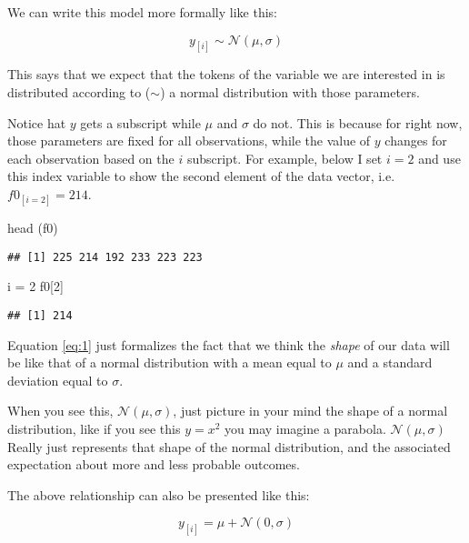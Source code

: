 \documentclass[
]{book}
\newenvironment{Shaded}{\begin{snugshade}}{\end{snugshade}}
\newcommand{\DecValTok}[1]{\textcolor[rgb]{0.00,0.00,0.81}{#1}}
\newcommand{\FunctionTok}[1]{\textcolor[rgb]{0.00,0.00,0.00}{#1}}
\newcommand{\NormalTok}[1]{#1}
\newcommand{\OtherTok}[1]{\textcolor[rgb]{0.56,0.35,0.01}{#1}}
\begin{document}
We can write this model more formally like this:

\[
y_{[i]} \sim \mathcal{N}(\mu,\sigma)
\label{eq:1}
\]

This says that we expect that the tokens of the variable we are interested in is distributed according to (\(\sim\)) a normal distribution with those parameters.

Notice hat \(y\) gets a subscript while \(\mu\) and \(\sigma\) do not. This is because for right now, those parameters are fixed for all observations, while the value of \(y\) changes for each observation based on the \(i\) subscript. For example, below I set \(i=2\) and use this index variable to show the second element of the data vector, i.e.~\(f0_{[i=2]}=214\).

\begin{Shaded}
\begin{Highlighting}[]
\FunctionTok{head}\NormalTok{ (f0)}
\end{Highlighting}
\end{Shaded}

\begin{verbatim}
## [1] 225 214 192 233 223 223
\end{verbatim}

\begin{Shaded}
\begin{Highlighting}[]
\NormalTok{i }\OtherTok{=} \DecValTok{2}
\NormalTok{f0[}\DecValTok{2}\NormalTok{]}
\end{Highlighting}
\end{Shaded}

\begin{verbatim}
## [1] 214
\end{verbatim}

Equation \eqref{eq:1} just formalizes the fact that we think the \emph{shape} of our data will be like that of a normal distribution with a mean equal to \(\mu\) and a standard deviation equal to \(\sigma\).

When you see this, \(\mathcal{N}(\mu,\sigma)\), just picture in your mind the shape of a normal distribution, like if you see this \(y=x^2\) you may imagine a parabola. \(\mathcal{N}(\mu,\sigma)\) Really just represents that shape of the normal distribution, and the associated expectation about more and less probable outcomes.

The above relationship can also be presented like this:

\[
y_{[i]} = \mu + \mathcal{N}(0,\sigma)
\label{eq:2}
\]
\end{document}
